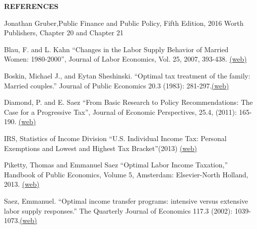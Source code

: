 \documentclass[landscape]{slides}
\begin{document}
\begin{slide}
\begin{center}
{\bf REFERENCES}
\end{center}
{\small

Jonathan Gruber,Public Finance and Public Policy, Fifth Edition, 2016 Worth Publishers, Chapter 20 and Chapter 21

Blau, F. and L. Kahn ``Changes in the Labor Supply Behavior of Married Women: 1980-2000'', Journal of Labor Economics, Vol. 25, 2007, 393-438. \href{http://www.jstor.org/stable/pdfplus/10.1086/513416.pdf} {(web)}

Boskin, Michael J., and Eytan Sheshinski. ``Optimal tax treatment of the family: Married couples.'' Journal of Public Economics 20.3 (1983): 281-297.\href{http://elsa.berkeley.edu/~saez/course131/Boskin-Sheshinski83.pdf} {(web)}

Diamond, P. and E. Saez ``From Basic Research to Policy Recommendations:
The Case for a Progressive Tax'', Journal of Economic Perspectives, 25.4, (2011): 165-190.
\href{http://elsa.berkeley.edu/~saez/diamond-saezJEP11full.pdf} {(web)}

IRS, Statistics of Income Division ``U.S. Individual Income Tax: Personal Exemptions and Lowest and Highest Tax Bracket''(2013) \href{http://elsa.berkeley.edu/~saez/course131/taxable-income4.pdf} {(web)}


Piketty, Thomas and Emmanuel Saez ``Optimal Labor Income Taxation,'' Handbook of Public Economics, Volume 5, Amsterdam: Elsevier-North Holland, 2013. \href{http://www.nber.org/papers/w18521.pdf} {(web)}

Saez, Emmanuel. ``Optimal income transfer programs: intensive versus extensive labor supply responses.'' The Quarterly Journal of Economics 117.3 (2002): 1039-1073.\href{http://elsa.berkeley.edu/~saez/botqje.pdf}{(web)}

}
\end{slide}
\end{document}

